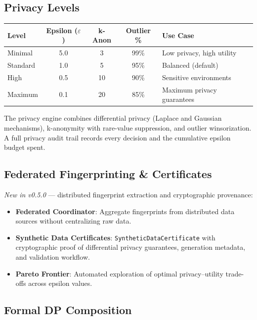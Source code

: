 \documentclass[11pt,a4paper]{article}
\begin{document}
\subsection{Privacy Levels}

\vspace{0.4em}
\noindent
\renewcommand{\arraystretch}{1.2}
\begin{tabularx}{\textwidth}{l c c c X}
\toprule
\textbf{Level} & \textbf{Epsilon ($\varepsilon$)} & \textbf{k-Anon} &
\textbf{Outlier \%} & \textbf{Use Case} \\
\midrule
Minimal  & 5.0  & 3  & 99\% & Low privacy, high utility \\
Standard & 1.0  & 5  & 95\% & Balanced (default) \\
High     & 0.5  & 10 & 90\% & Sensitive environments \\
Maximum  & 0.1  & 20 & 85\% & Maximum privacy guarantees \\
\bottomrule
\end{tabularx}
\renewcommand{\arraystretch}{1.0}

The privacy engine combines differential privacy (Laplace and Gaussian
mechanisms), k-anonymity with rare-value suppression, and outlier
winsorization. A full privacy audit trail records every decision and the
cumulative epsilon budget spent.

\subsection{Federated Fingerprinting \& Certificates}

\textit{New in v0.5.0} --- distributed fingerprint extraction and
cryptographic provenance:

\begin{itemize}[leftmargin=1.4em, itemsep=2pt]
  \item \textbf{Federated Coordinator}: Aggregate fingerprints from
        distributed data sources without centralizing raw data.
  \item \textbf{Synthetic Data Certificates}: \texttt{SyntheticDataCertificate}
        with cryptographic proof of differential privacy guarantees,
        generation metadata, and validation workflow.
  \item \textbf{Pareto Frontier}: Automated exploration of optimal
        privacy--utility trade-offs across epsilon values.
\end{itemize}

\subsection{Formal DP Composition}
\end{document}

